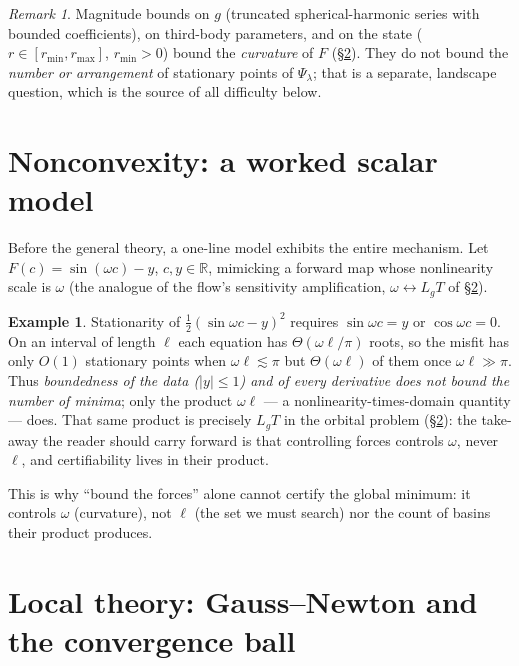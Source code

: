 \documentclass[11pt]{article}
\theoremstyle{plain}
\theoremstyle{definition}
\newtheorem{example}[theorem]{Example}
\theoremstyle{remark}
\newtheorem*{remark}{Remark}
\newcommand{\R}{\mathbb{R}}
\newcommand{\abs}[1]{\left\lvert#1\right\rvert}
\begin{document}
\begin{remark}
Magnitude bounds on $g$ (truncated spherical-harmonic series with bounded
coefficients), on third-body parameters, and on the state
($r\in[r_{\min},r_{\max}]$, $r_{\min}>0$) bound the \emph{curvature} of
$F$ (\S\ref{sec:local}). They do not bound the \emph{number or
arrangement} of stationary points of $\Psi_\lambda$; that is a separate,
landscape question, which is the source of all difficulty below.
\end{remark}

\section{Nonconvexity: a worked scalar model}\label{sec:toy}

Before the general theory, a one-line model exhibits the entire
mechanism. Let $F(c)=\sin(\omega c)-y$, $c,y\in\R$, mimicking a forward
map whose nonlinearity scale is $\omega$ (the analogue of the flow's
sensitivity amplification, $\omega\leftrightarrow L_gT$ of
\S\ref{sec:local}).

\begin{example}\label{ex:scalar}
Stationarity of $\tfrac12(\sin\omega c-y)^{2}$ requires $\sin\omega c=y$
or $\cos\omega c=0$. On an interval of length $\ell$ each equation has
$\Theta(\omega\ell/\pi)$ roots, so the misfit has only $O(1)$ stationary
points when $\omega\ell\lesssim\pi$ but $\Theta(\omega\ell)$ of them once
$\omega\ell\gg\pi$. Thus \emph{boundedness of the data ($\abs y\le1$) and
of every derivative does not bound the number of minima}; only the
product $\omega\ell$ --- a nonlinearity-times-domain quantity --- does.
That same product is precisely $L_gT$ in the orbital problem
(\S\ref{sec:local}): the take-away the reader should carry forward is that
controlling forces controls $\omega$, never $\ell$, and certifiability
lives in their product.
\end{example}

This is why ``bound the forces'' alone cannot certify the global
minimum: it controls $\omega$ (curvature), not $\ell$ (the set we must
search) nor the count of basins their product produces.

\section{Local theory: Gauss--Newton and the convergence ball}
\label{sec:local}
\end{document}

